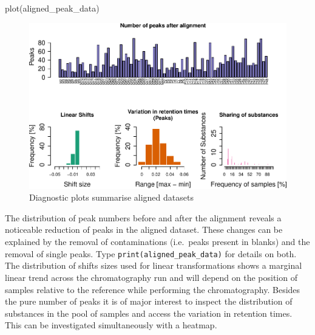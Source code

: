 \begin{Schunk}
\begin{Sinput}
plot(aligned_peak_data)
\end{Sinput}
\begin{figure}

{\centering \includegraphics{ottensmann-stoffel-hoffman_files/figure-latex/unnamed-chunk-6-1} 

}

\caption[Diagnostic plots summarise aligned datasets]{Diagnostic plots summarise aligned datasets}\label{fig:unnamed-chunk-6}
\end{figure}
\end{Schunk}

The distribution of peak numbers before and after the alignment reveals
a noticeable reduction of peaks in the aligned dataset. These changes
can be explained by the removal of contaminations (i.e.~peaks present in
blanks) and the removal of single peaks. Type
\texttt{print(aligned\_peak\_data)} for details on both. The
distribution of shifts sizes used for linear transformations shows a
marginal linear trend across the chromatography run and will depend on
the position of samples relative to the reference while performing the
chromatography. Besides the pure number of peaks it is of major interest
to inspect the distribution of substances in the pool of samples and
access the variation in retention times. This can be investigated
simultaneously with a heatmap.

